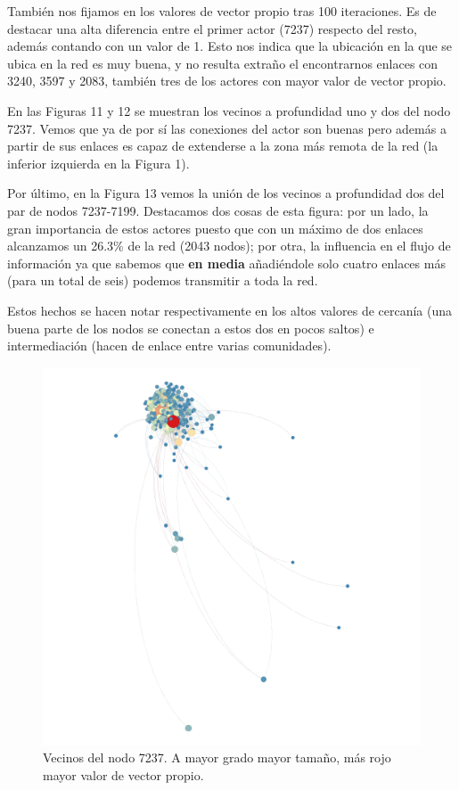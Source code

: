 También nos fijamos en los valores de vector propio tras 100 iteraciones. Es de destacar una alta diferencia entre el primer actor (7237) respecto del resto, además contando con un valor de 1. Esto nos indica que la ubicación en la que se ubica en la red es muy buena, y no resulta extraño el encontrarnos enlaces con 3240, 3597 y 2083, también tres de los actores con mayor valor de vector propio.

\vspace{\baselineskip}

En las Figuras 11 y 12 se muestran los vecinos a profundidad uno y dos del nodo 7237. Vemos que ya de por sí las conexiones del actor son buenas pero además a partir de sus enlaces es capaz de extenderse a la zona más remota de la red (la inferior izquierda en la Figura 1).

\vspace{\baselineskip}

Por último, en la Figura 13 vemos la unión de los vecinos a profundidad dos del par de nodos 7237-7199. Destacamos dos cosas de esta figura: por un lado, la gran importancia de estos actores puesto que con un máximo de dos enlaces alcanzamos un 26.3\% de la red (2043 nodos); por otra, la influencia en el flujo de información ya que sabemos que \textbf{en media} añadiéndole solo cuatro enlaces más (para un total de seis) podemos transmitir a toda la red.

Estos hechos se hacen notar respectivamente en los altos valores de cercanía (una buena parte de los nodos se conectan a estos dos en pocos saltos) e intermediación (hacen de enlace entre varias comunidades). 

\begin{figure}[H]
    \centerfloat
    \includegraphics[width=1.3\textwidth]{img/resultados/grado-vector7237.png}
    \caption{Vecinos del nodo 7237. A mayor grado mayor tamaño, más rojo mayor valor de vector propio.}
\end{figure}

